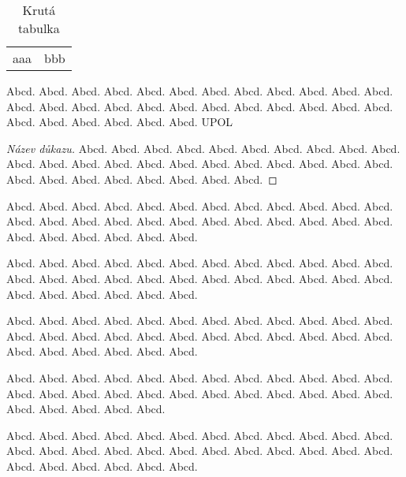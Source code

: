 \documentclass[
	iwona=true,									%
	printversion=false,					%
	joinlists=true,							%
	glossaries=true,						%
	figures=true,								%
	tables=true,								%
	sourcecodes=true,						%
	theorems=true,							%
	bibencoding=utf8,						%
	language=czech,							%
	encoding=utf8,							%
	master=true,								%
  index=true									%
]{updiplom}
\begin{document}
\begin{table}
\begin{tabular}{c | c}
aaa & bbb 
\end{tabular}
\caption{Krutá tabulka}
\end{table}



\begin{definition}
Abcd. Abcd. Abcd. Abcd. Abcd. Abcd. Abcd. Abcd. Abcd. Abcd. Abcd. Abcd. Abcd. Abcd. Abcd. Abcd. Abcd. Abcd. Abcd. Abcd. Abcd. Abcd. Abcd. Abcd. Abcd. Abcd. Abcd. Abcd. Abcd. Abcd. \gls{UPOL}
\end{definition}

\begin{proof}[Název důkazu]
Abcd. Abcd. Abcd. Abcd. Abcd. Abcd. Abcd. Abcd. Abcd. Abcd. Abcd. Abcd. Abcd. Abcd. Abcd. Abcd. Abcd. Abcd. Abcd. Abcd. Abcd. Abcd. Abcd. Abcd. Abcd. Abcd. Abcd. Abcd. Abcd. Abcd. 
\end{proof}

\begin{remark}
Abcd. Abcd. Abcd. Abcd. Abcd. Abcd. Abcd. Abcd. Abcd. Abcd. Abcd. Abcd. Abcd. Abcd. Abcd. Abcd. Abcd. Abcd. Abcd. Abcd. Abcd. Abcd. Abcd. Abcd. Abcd. Abcd. Abcd. Abcd. Abcd. Abcd. 
\end{remark}

\begin{example}
Abcd. Abcd. Abcd. Abcd. Abcd. Abcd. Abcd. Abcd. Abcd. Abcd. Abcd. Abcd. Abcd. Abcd. Abcd. Abcd. Abcd. Abcd. Abcd. Abcd. Abcd. Abcd. Abcd. Abcd. Abcd. Abcd. Abcd. Abcd. Abcd. Abcd. 
\end{example}

\begin{lemma}
Abcd. Abcd. Abcd. Abcd. Abcd. Abcd. Abcd. Abcd. Abcd. Abcd. Abcd. Abcd. Abcd. Abcd. Abcd. Abcd. Abcd. Abcd. Abcd. Abcd. Abcd. Abcd. Abcd. Abcd. Abcd. Abcd. Abcd. Abcd. Abcd. Abcd. 
\end{lemma}

\begin{consequence}
Abcd. Abcd. Abcd. Abcd. Abcd. Abcd. Abcd. Abcd. Abcd. Abcd. Abcd. Abcd. Abcd. Abcd. Abcd. Abcd. Abcd. Abcd. Abcd. Abcd. Abcd. Abcd. Abcd. Abcd. Abcd. Abcd. Abcd. Abcd. Abcd. 
\end{consequence}

\begin{theorem}
Abcd. Abcd. Abcd. Abcd. Abcd. Abcd. Abcd. Abcd. Abcd. Abcd. Abcd. Abcd. Abcd. Abcd. Abcd. Abcd. Abcd. Abcd. Abcd. Abcd. Abcd. Abcd. Abcd. Abcd. Abcd. Abcd. Abcd. Abcd. Abcd. Abcd. 
\end{theorem}
\end{document}
